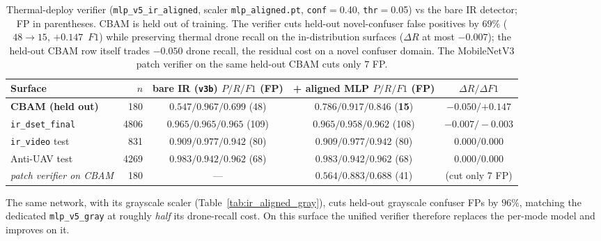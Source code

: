 \begin{table}[htbp]
    \centering
    \caption{Thermal-deploy verifier (\texttt{mlp\_v5\_ir\_aligned}, scaler \texttt{mlp\_aligned.pt}, \texttt{conf}$=$0.40, \texttt{thr}$=$0.05) vs the bare IR detector; FP in parentheses. CBAM is held out of training. The verifier cuts held-out novel-confuser false positives by $69\%$ ($48\to15$, $+0.147$~$F1$) while preserving thermal drone recall on the in-distribution surfaces ($\Delta R$ at most $-0.007$); the held-out CBAM row itself trades $-0.050$ drone recall, the residual cost on a novel confuser domain. The MobileNetV3 patch verifier on the same held-out CBAM cuts only $7$ FP.}
    \label{tab:ir_aligned}
    \begin{tabular}{lrccc}
        \toprule
        Surface & $n$ & bare IR (\texttt{v3b}) $P/R/F1$ (FP) & + aligned MLP $P/R/F1$ (FP) & $\Delta R / \Delta F1$ \\
        \midrule
        \textbf{CBAM (held out)}  & 180  & $0.547/0.967/0.699$ (48) & $\mathbf{0.786/0.917/0.846}$ (\textbf{15}) & $-0.050 / \mathbf{+0.147}$ \\
        \texttt{ir\_dset\_final}  & 4806 & $0.965/0.965/0.965$ (109) & $0.965/0.958/0.962$ (108) & $-0.007 / -0.003$ \\
        \texttt{ir\_video} test   & 831  & $0.909/0.977/0.942$ (80) & $0.909/0.977/0.942$ (80) & $0.000 / 0.000$ \\
        Anti-UAV test             & 4269 & $0.983/0.942/0.962$ (68) & $0.983/0.942/0.962$ (68) & $0.000 / 0.000$ \\
        \midrule
        \emph{patch verifier on CBAM} & 180 & --- & $0.564/0.883/0.688$ (41) & (cut only 7 FP) \\
        \bottomrule
    \end{tabular}
\end{table}

The same network, with its grayscale scaler (Table~\ref{tab:ir_aligned_gray}), cuts held-out grayscale confuser FPs by $96\%$, matching the dedicated \texttt{mlp\_v5\_gray} at roughly \emph{half} its drone-recall cost. On this surface the unified verifier therefore replaces the per-mode model and improves on it.


